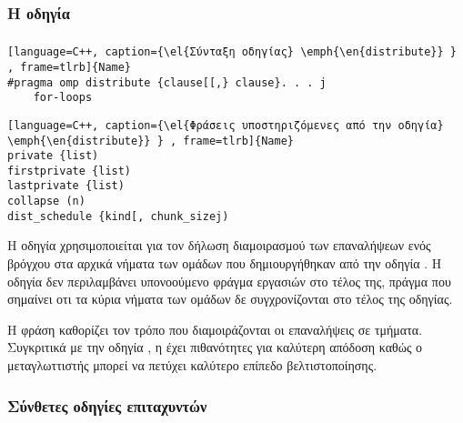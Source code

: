 \subsubsection{Η οδηγία }
\subparagraph{}


\begin{lstlisting}[language=C++, caption={\el{Σύνταξη οδηγίας} \emph{\en{distribute}} } , frame=tlrb]{Name}
#pragma omp distribute {clause[[,} clause}. . . j
	for-loops
\end{lstlisting}


\begin{lstlisting}[language=C++, caption={\el{Φράσεις υποστηριζόμενες από την οδηγία} \emph{\en{distribute}} } , frame=tlrb]{Name}
private {list)
firstprivate {list)
lastprivate {list)
collapse (n)
dist_schedule {kind[, chunk_sizej)
\end{lstlisting}

Η οδηγία \emph{} χρησιμοποιείται για τον δήλωση διαμοιρασμού των επαναλήψεων ενός βρόγχου στα αρχικά νήματα των ομάδων που δημιουργήθηκαν από την οδηγία \emph{}. Η οδηγία δεν περιλαμβάνει υπονοούμενο φράγμα εργασιών στο τέλος της, πράγμα που σημαίνει οτι τα κύρια νήματα των ομάδων δε συγχρονίζονται στο τέλος της οδηγίας.

Η φράση \emph{} καθορίζει τον τρόπο που διαμοιράζονται οι επαναλήψεις σε τμήματα. Συγκριτικά με την οδηγία \emph{}, η \emph{} έχει πιθανότητες για καλύτερη απόδοση καθώς ο μεταγλωττιστής μπορεί να πετύχει καλύτερο επίπεδο βελτιστοποίησης.



\subsubsection{Σύνθετες οδηγίες επιταχυντών}
\subparagraph{}

